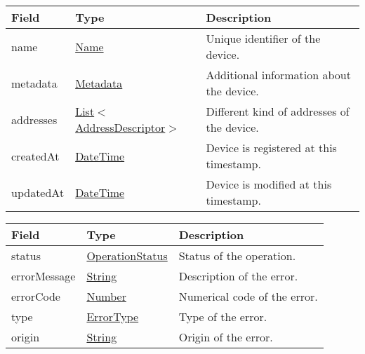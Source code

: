 \documentclass[a4paper]{arrowhead}
\newcommand{\pref}[1]{{\textcolor{ArrowheadGrey}{\hyperref[sec:model:primitives:#1]{#1}}}}
\begin{document}
\label{sec:model:DeviceDescriptor}
 
\begin{table}[ht!]
\begin{tabularx}{\textwidth}{| p{4.25cm} | p{4cm} | X |} \hline
\rowcolor{gray!33} Field & Type      & Description \\ \hline
name & \pref{Name} & Unique identifier of the device. \\ \hline
metadata & \hyperref[sec:model:Metadata]{Metadata} & Additional information about the device. \\ \hline
addresses &  \pref{List}$<$\hyperref[sec:model:AddressDescriptor]{AddressDescriptor}$>$ & Different kind of addresses of the device.  \\ \hline
createdAt & \pref{DateTime} & Device is registered at this timestamp. \\ \hline
updatedAt & \pref{DateTime} & Device is modified at this timestamp. \\ \hline
\end{tabularx}
\end{table}

\label{sec:model:ErrorResponse}

\begin{table}[ht!]
\begin{tabularx}{\textwidth}{| p{4.25cm} | p{3.5cm} | X |} \hline
\rowcolor{gray!33} Field & Type      & Description \\ \hline
status & \pref{OperationStatus} & Status of the operation. \\ \hline
errorMessage & \pref{String} & Description of the error. \\ \hline
errorCode &\pref{Number}  & Numerical code of the error. \\ \hline
type & \pref{ErrorType} & Type of the error. \\ \hline
origin & \pref{String} & Origin of the error. \\ \hline
\end{tabularx}
\end{table}

\clearpage

\label{sec:model:SystemLookupRequest}
\end{document}
